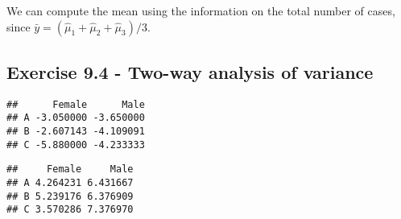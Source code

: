 \documentclass[]{book}
\newenvironment{Shaded}{\begin{snugshade}}{\end{snugshade}}
\newcommand{\CommentTok}[1]{\textcolor[rgb]{0.56,0.35,0.01}{\textit{#1}}}
\newcommand{\DataTypeTok}[1]{\textcolor[rgb]{0.13,0.29,0.53}{#1}}
\newcommand{\KeywordTok}[1]{\textcolor[rgb]{0.13,0.29,0.53}{\textbf{#1}}}
\newcommand{\NormalTok}[1]{#1}
\newcommand{\OperatorTok}[1]{\textcolor[rgb]{0.81,0.36,0.00}{\textbf{#1}}}
\newcommand{\OtherTok}[1]{\textcolor[rgb]{0.56,0.35,0.01}{#1}}
\newcommand{\StringTok}[1]{\textcolor[rgb]{0.31,0.60,0.02}{#1}}
\theoremstyle{definition}
\theoremstyle{definition}
\theoremstyle{definition}
\theoremstyle{remark}
\begin{document}
We can compute the mean using the information on the total number of
cases, since \(\bar{y} = (\hat{\mu}_1+\hat{\mu}_2 + \hat{\mu}_3)/3\).

\hypertarget{exercise-9.4---two-way-analysis-of-variance}{%
\subsection{Exercise 9.4 - Two-way analysis of
variance}\label{exercise-9.4---two-way-analysis-of-variance}}

\begin{Shaded}
\end{Shaded}

\begin{verbatim}
##      Female      Male
## A -3.050000 -3.650000
## B -2.607143 -4.109091
## C -5.880000 -4.233333
\end{verbatim}

\begin{Shaded}
\end{Shaded}

\begin{verbatim}
##     Female     Male
## A 4.264231 6.431667
## B 5.239176 6.376909
## C 3.570286 7.376970
\end{verbatim}
\end{document}
